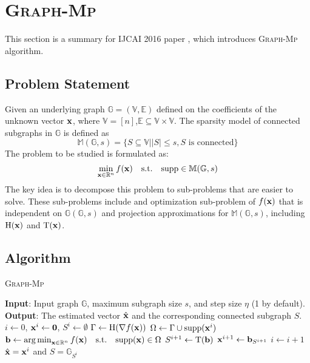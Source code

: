 \documentclass{article}
\let\oldReturn\Return
\renewcommand{\Return}{\State\oldReturn}
\DeclareMathOperator*{\argmin}{arg\,min}
\begin{document}
\section{\textsc{Graph}-\textsc{Mp}}

This section is a summary for IJCAI 2016 paper \cite{chen2016generalized}, which introduces \textsc{Graph}-\textsc{Mp} algorithm.

\subsection{Problem Statement}

Given an underlying graph $\mathbb{G}=(\mathbb{V},\mathbb{E})$ defined on the coefficients of the unknown vector ${\bf x}$, where $\mathbb{V}=[n]$,$\mathbb{E}\subseteq\mathbb{V}\times\mathbb{V}$. The sparsity model of connected subgraphs in $\mathbb{G}$ is defined as
\begin{equation}
\mathbb{M}(\mathbb{G},s)=\{S\subseteq\mathbb{V}||S|\leq s, S \text{ is connected} \}
\end{equation}
The problem to be studied is formulated as:
\begin{equation}\label{prob:graphmp}
\min_{{\bf x}\in\mathbb{R}^n} f({\bf x})\quad\mathrm{s.t.}\quad\mathrm{supp}\in\mathbb{M}(\mathbb{G},s)
\end{equation}
The key idea is to decompose this problem to sub-problems that are easier to solve. These sub-problems include and optimization sub-problem of $f({\bf x})$ that is independent on $\mathbb{G}(\mathbb{G},s)$ and projection approximations for $\mathbb{M}(\mathbb{G},s)$, including $\mathrm{H}({\bf x})$ and $\mathrm{T}({\bf x})$.

\subsection{Algorithm}

\begin{algorithm}
\caption{\textsc{Graph}-\textsc{Mp}}\label{alg:graphmp}
\begin{algorithmic}[1]
\State \textbf{Input}: Input graph $\mathbb{G}$, maximum subgraph size $s$, and step size $\eta$ (1 by default).
\State \textbf{Output}: The estimated vector $\hat{{\bf x}}$ and the corresponding connected subgraph $S$.
\State $i\gets 0$, ${\bf x}^i\gets {\bf 0}$, $S^i\gets\emptyset$
\Repeat
\State $\Gamma\gets\mathrm{H}(\nabla f({\bf x}))$
\State $\Omega\gets\Gamma\cup\mathrm{supp}({\bf x}^i)$
\State ${\bf b}\gets\argmin_{{\bf x}\in\mathbb{R}^n}f({\bf x})\quad\mathrm{s.t.}\quad\mathrm{supp}({\bf x})\in\Omega$\label{alg:mp:argmin}
\State $S^{i+1}\gets\mathrm{T}({\bf b})$
\State ${\bf x}^{i+1}\gets{\bf b}_{S^{i+1}}$
\State $i\gets i+1$
\Return $\hat{{\bf x}}={\bf x}^i$ and $S=\mathbb{G}_{S^i}$
\end{algorithmic}
\end{algorithm}
\end{document}
